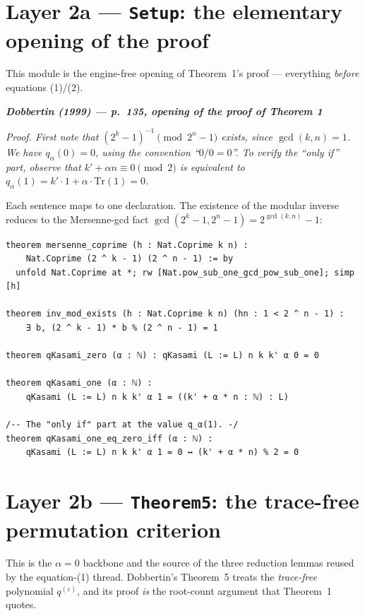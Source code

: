 \documentclass[11pt]{article}
\newenvironment{paperquote}[1]
 {\par\smallskip\noindent
  \def\FrameCommand{\color{quotebar}\vrule width 3pt\hspace{8pt}}%
  \MakeFramed{\advance\hsize-\width \FrameRestore}%
  \small\itshape
  \noindent\normalfont\footnotesize\textbf{\textsf{Dobbertin (1999) --- #1}}\par\nobreak\smallskip\itshape}
 {\endMakeFramed\par\smallskip}
\theoremstyle{definition}
\begin{document}
\section{Layer 2a --- \texttt{Setup}: the elementary opening of the proof}

This module is the engine-free opening of Theorem~1's proof --- everything
\emph{before} equations (1)/(2).

\begin{paperquote}{p.~135, opening of the proof of Theorem 1}
\emph{Proof.} First note that $(2^k-1)^{-1}\pmod{2^n-1}$ exists, since
$\gcd(k,n)=1$. We have $q_\alpha(0)=0$, using the convention ``$0/0=0$''. To
verify the ``only if'' part, observe that $k'+\alpha n\equiv 0\pmod 2$ is
equivalent to $q_\alpha(1)=k'\cdot 1+\alpha\cdot\mathrm{Tr}(1)=0$.
\end{paperquote}

Each sentence maps to one declaration.  The existence of the modular inverse
reduces to the Mersenne-gcd fact
$\gcd(2^k-1,2^n-1)=2^{\gcd(k,n)}-1$:

\begin{lstlisting}
theorem mersenne_coprime (h : Nat.Coprime k n) :
    Nat.Coprime (2 ^ k - 1) (2 ^ n - 1) := by
  unfold Nat.Coprime at *; rw [Nat.pow_sub_one_gcd_pow_sub_one]; simp [h]

theorem inv_mod_exists (h : Nat.Coprime k n) (hn : 1 < 2 ^ n - 1) :
    ∃ b, (2 ^ k - 1) * b % (2 ^ n - 1) = 1

theorem qKasami_zero (α : ℕ) : qKasami (L := L) n k k' α 0 = 0

theorem qKasami_one (α : ℕ) :
    qKasami (L := L) n k k' α 1 = ((k' + α * n : ℕ) : L)

/-- The "only if" part at the value q_α(1). -/
theorem qKasami_one_eq_zero_iff (α : ℕ) :
    qKasami (L := L) n k k' α 1 = 0 ↔ (k' + α * n) % 2 = 0
\end{lstlisting}

\section{Layer 2b --- \texttt{Theorem5}: the trace-free permutation criterion}

This is the $\alpha=0$ backbone and the source of the three reduction lemmas
reused by the equation-(1) thread.  Dobbertin's Theorem~5 treats the
\emph{trace-free} polynomial $q^{(\varepsilon)}$, and its proof \emph{is} the
root-count argument that Theorem~1 quotes.
\end{document}
